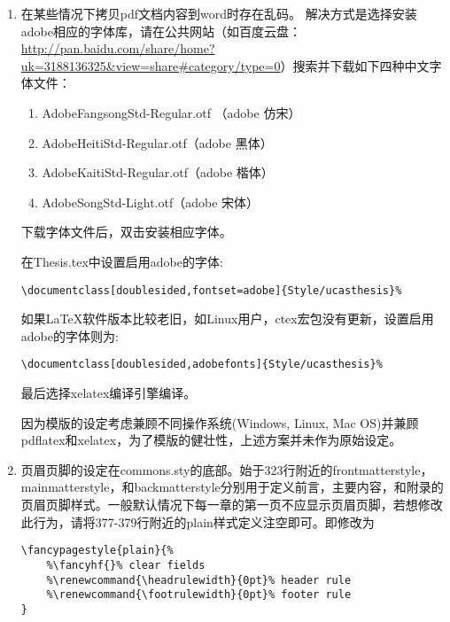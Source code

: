 \begin{enumerate}
      \verb+\setmainfont{Times New Roman}+
  \item 在某些情况下拷贝pdf文档内容到word时存在乱码。
      解决方式是选择安装adobe相应的字体库，请在公共网站（如百度云盘：\url{http://pan.baidu.com/share/home?uk=3188136325&view=share#category/type=0}）搜索并下载如下四种中文字体文件：
      \begin{enumerate}
          \item AdobeFangsongStd-Regular.otf （adobe 仿宋）
          \item AdobeHeitiStd-Regular.otf（adobe 黑体）
          \item AdobeKaitiStd-Regular.otf（adobe 楷体）
          \item AdobeSongStd-Light.otf（adobe 宋体）
      \end{enumerate}
      下载字体文件后，双击安装相应字体。
      
      在Thesis.tex中设置启用adobe的字体:

      \verb+\documentclass[doublesided,fontset=adobe]{Style/ucasthesis}%+

      如果\LaTeX{}软件版本比较老旧，如Linux用户，ctex宏包没有更新，设置启用adobe的字体则为:

      \verb+\documentclass[doublesided,adobefonts]{Style/ucasthesis}%+
     
     最后选择xelatex编译引擎编译。

     因为模版的设定考虑兼顾不同操作系统(Windows, Linux, Mac OS)并兼顾pdflatex和xelatex，为了模版的健壮性，上述方案并未作为原始设定。
 \item 页眉页脚的设定在commons.sty的底部。始于323行附近的frontmatterstyle，mainmatterstyle，和backmatterstyle分别用于定义前言，主要内容，和附录的页眉页脚样式。一般默认情况下每一章的第一页不应显示页眉页脚，若想修改此行为，请将377-379行附近的plain样式定义注空即可。即修改为

\begin{verbatim}
\fancypagestyle{plain}{%
    %\fancyhf{}% clear fields
    %\renewcommand{\headrulewidth}{0pt}% header rule
    %\renewcommand{\footrulewidth}{0pt}% footer rule
}
\end{verbatim}
     

\end{enumerate}
